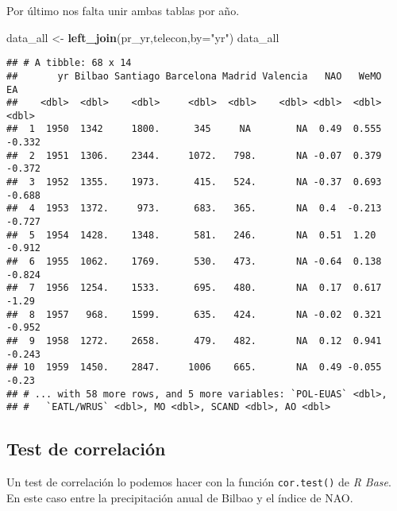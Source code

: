 \documentclass[]{article}
\newenvironment{Shaded}{\begin{snugshade}}{\end{snugshade}}
\newcommand{\KeywordTok}[1]{\textcolor[rgb]{0.13,0.29,0.53}{\textbf{#1}}}
\newcommand{\DataTypeTok}[1]{\textcolor[rgb]{0.13,0.29,0.53}{#1}}
\newcommand{\StringTok}[1]{\textcolor[rgb]{0.31,0.60,0.02}{#1}}
\newcommand{\OperatorTok}[1]{\textcolor[rgb]{0.81,0.36,0.00}{\textbf{#1}}}
\newcommand{\NormalTok}[1]{#1}
\begin{document}
Por último nos falta unir ambas tablas por año.

\begin{Shaded}
\begin{Highlighting}[]
\NormalTok{data_all <-}\StringTok{ }\KeywordTok{left_join}\NormalTok{(pr_yr,telecon,}\DataTypeTok{by=}\StringTok{"yr"}\NormalTok{)}
\NormalTok{data_all}
\end{Highlighting}
\end{Shaded}

\begin{verbatim}
## # A tibble: 68 x 14
##       yr Bilbao Santiago Barcelona Madrid Valencia   NAO   WeMO     EA
##    <dbl>  <dbl>    <dbl>     <dbl>  <dbl>    <dbl> <dbl>  <dbl>  <dbl>
##  1  1950  1342     1800.      345     NA        NA  0.49  0.555 -0.332
##  2  1951  1306.    2344.     1072.   798.       NA -0.07  0.379 -0.372
##  3  1952  1355.    1973.      415.   524.       NA -0.37  0.693 -0.688
##  4  1953  1372.     973.      683.   365.       NA  0.4  -0.213 -0.727
##  5  1954  1428.    1348.      581.   246.       NA  0.51  1.20  -0.912
##  6  1955  1062.    1769.      530.   473.       NA -0.64  0.138 -0.824
##  7  1956  1254.    1533.      695.   480.       NA  0.17  0.617 -1.29 
##  8  1957   968.    1599.      635.   424.       NA -0.02  0.321 -0.952
##  9  1958  1272.    2658.      479.   482.       NA  0.12  0.941 -0.243
## 10  1959  1450.    2847.     1006    665.       NA  0.49 -0.055 -0.23 
## # ... with 58 more rows, and 5 more variables: `POL-EUAS` <dbl>,
## #   `EATL/WRUS` <dbl>, MO <dbl>, SCAND <dbl>, AO <dbl>
\end{verbatim}

\subsection{Test de correlación}\label{test-de-correlacion}

Un test de correlación lo podemos hacer con la función
\texttt{cor.test()} de \emph{R Base}. En este caso entre la
precipitación anual de Bilbao y el índice de NAO.

\begin{Shaded}
\end{Shaded}
\end{document}
